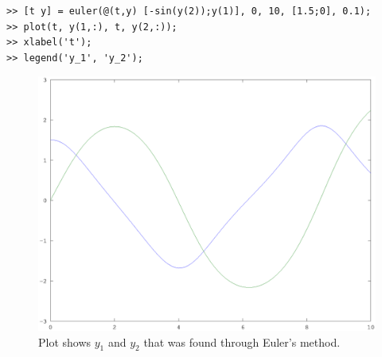 \documentclass[00-main.tex]{subfiles}
\begin{document}
\begin{verbatim}
>> [t y] = euler(@(t,y) [-sin(y(2));y(1)], 0, 10, [1.5;0], 0.1);
>> plot(t, y(1,:), t, y(2,:));
>> xlabel('t');
>> legend('y_1', 'y_2');
\end{verbatim}

\begin{figure}
\includegraphics[width=\textwidth]{euler_plot}
\caption{Plot shows $y_1$ and $y_2$ that was found through Euler's method.}
\end{figure}


\end{document}
